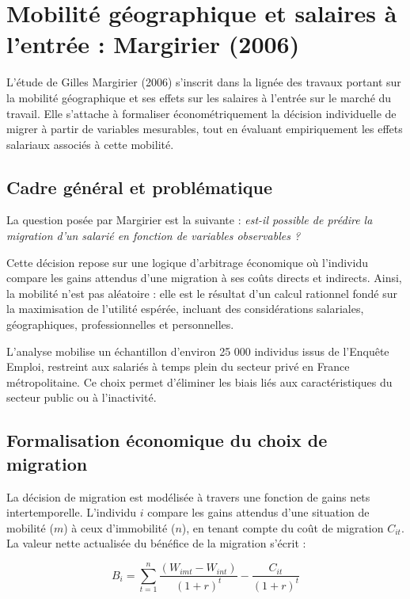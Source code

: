 \documentclass[12pt,a4paper]{article}
\begin{document}
\newpage

\section{Mobilité géographique et salaires à l’entrée : Margirier (2006)}

L’étude de Gilles Margirier (2006) s’inscrit dans la lignée des travaux portant sur la mobilité géographique et ses effets sur les salaires à l’entrée sur le marché du travail. 
Elle s’attache à formaliser économétriquement la décision individuelle de migrer à partir de variables mesurables, tout en évaluant empiriquement les effets salariaux associés à cette mobilité.

\subsection{Cadre général et problématique}

La question posée par Margirier est la suivante : 
\textit{est-il possible de prédire la migration d’un salarié en fonction de variables observables ?}  

Cette décision repose sur une logique d’arbitrage économique où l’individu compare les gains attendus d’une migration à ses coûts directs et indirects. 
Ainsi, la mobilité n’est pas aléatoire : elle est le résultat d’un calcul rationnel fondé sur la maximisation de l’utilité espérée, incluant des considérations salariales, géographiques, professionnelles et personnelles.

L’analyse mobilise un échantillon d’environ 25 000 individus issus de l’Enquête Emploi, restreint aux salariés à temps plein du secteur privé en France métropolitaine. 
Ce choix permet d’éliminer les biais liés aux caractéristiques du secteur public ou à l’inactivité.

\subsection{Formalisation économique du choix de migration}

La décision de migration est modélisée à travers une fonction de gains nets intertemporelle. 
L’individu $i$ compare les gains attendus d’une situation de mobilité ($m$) à ceux d’immobilité ($n$), en tenant compte du coût de migration $C_{it}$.  
La valeur nette actualisée du bénéfice de la migration s’écrit :

\begin{equation}
B_i = \sum_{t=1}^{n} \frac{(W_{imt} - W_{int})}{(1 + r)^t} - \frac{C_{it}}{(1 + r)^t}
\end{equation}
\end{document}
